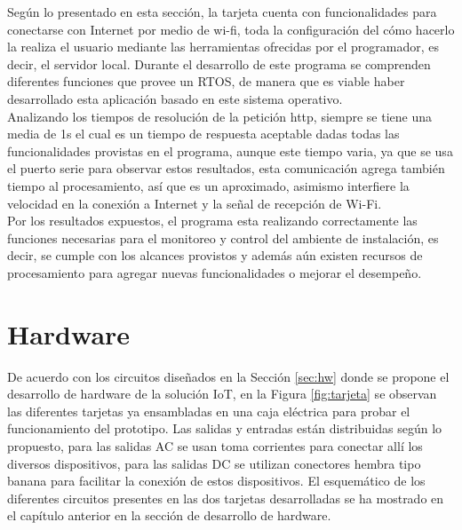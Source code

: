 Según lo presentado en esta sección, la tarjeta cuenta con funcionalidades para conectarse con Internet por medio de wi-fi, toda la configuración del cómo hacerlo la realiza el usuario mediante las herramientas ofrecidas por el programador, es decir, el servidor local. Durante el desarrollo de este programa se comprenden diferentes funciones que provee un RTOS, de manera que es viable haber desarrollado esta aplicación basado en este sistema operativo.\\

Analizando los tiempos de resolución de la petición http, siempre se tiene una media de 1s el cual es un tiempo de respuesta aceptable dadas todas las funcionalidades provistas en el programa, aunque este tiempo varia, ya que se usa el puerto serie para observar estos resultados, esta comunicación agrega también tiempo al procesamiento, así que es un aproximado, asimismo interfiere la velocidad en la conexión a Internet y la señal de recepción de Wi-Fi.\\

Por los resultados expuestos, el programa esta realizando correctamente las funciones necesarias para el monitoreo y control del ambiente de instalación, es decir, se cumple con los alcances provistos y además aún existen recursos de procesamiento para agregar nuevas funcionalidades o mejorar el desempeño.\\

\section{Hardware}

De acuerdo con los circuitos diseñados en la Sección \ref{sec:hw} donde se propone el desarrollo de hardware de la solución IoT, en la Figura \ref{fig:tarjeta} se observan las diferentes tarjetas ya ensambladas en una caja eléctrica para probar el funcionamiento del prototipo. Las salidas y entradas están distribuidas según lo propuesto, para las salidas AC se usan toma corrientes para conectar allí los diversos dispositivos, para las salidas DC se utilizan conectores hembra tipo banana para facilitar la conexión de estos dispositivos. El esquemático de los diferentes circuitos presentes en las dos tarjetas desarrolladas se ha mostrado en el capítulo anterior en la sección de desarrollo de hardware.\\

